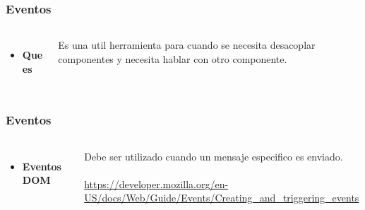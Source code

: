 \documentclass{beamer}
\begin{document}
\begin{frame}
\frametitle{Eventos}
\begin{columns}[c]
\begin{itemize}
\item \textbf{Que es}
\end{itemize}

Es una util herramienta  para cuando se necesita desacoplar componentes y necesita hablar con otro componente.
\end{columns}
\end{frame}
\begin{frame}
\frametitle{Eventos}
\begin{columns}[c]
\begin{itemize}
\item \textbf{Eventos DOM}
\end{itemize}

Debe ser utilizado cuando un mensaje especifico es enviado.
\\~\\
{\color{blue}\url{https://developer.mozilla.org/en-US/docs/Web/Guide/Events/Creating_and_triggering_events}}
\end{columns}
\end{frame}
\end{document}
